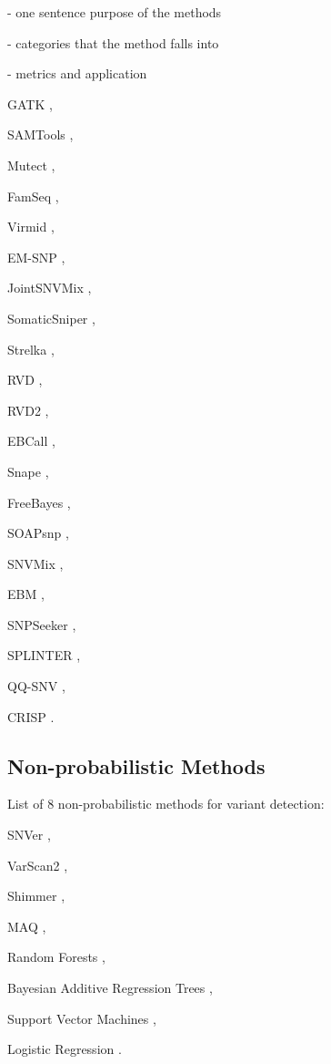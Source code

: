 \documentclass[11pt,reqno]{amsart}
\begin{document}
- one sentence purpose of the methods

- categories that the method falls into

- metrics and application

GATK \citep{McKenna2010},



SAMTools \citep{Li2009a},

Mutect \citep{Cibulskis2013},

FamSeq \citep{Peng2013},

Virmid \citep{Kim2013},

EM-SNP \citep{Chen2013},

JointSNVMix \citep{Roth2012},

SomaticSniper \citep{Larson2012},

Strelka \citep{Saunders2012},

RVD \citep{Flaherty2012},

RVD2 \citep{He2015},

EBCall \citep{Shiraishi2013},

Snape \citep{Raineri2012},

FreeBayes \citep{Garrison2012},

SOAPsnp \citep{Li2009},

SNVMix \citep{Goya2010},

EBM \citep{Zhou2012},

SNPSeeker \citep{Druley2009},

SPLINTER \citep{Spencer2014},

QQ-SNV \citep{VanderBorght2015},

CRISP \citep{Bansal2010}.

\subsection{Non-probabilistic Methods}
List of 8 non-probabilistic methods for variant detection:

SNVer \citep{Wei2011},

VarScan2 \citep{Koboldt2012},

Shimmer \citep{Hansen2013},

MAQ \citep{Li2008},

Random Forests \citep{Ding2012},

Bayesian Additive Regression Trees \citep{Ding2012},

Support Vector Machines \citep{Ding2012},

Logistic Regression \citep{Ding2012}.




\end{document}
